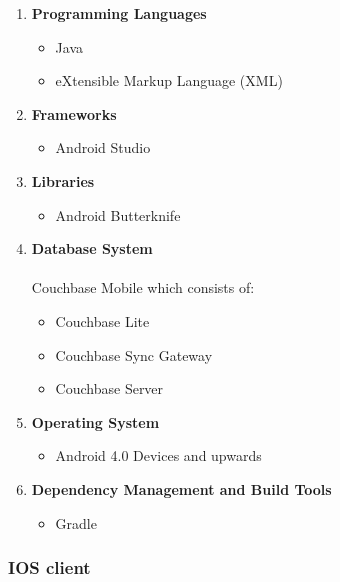 \documentclass{article}
\begin{document}
			\begin{enumerate}
				 \item \textbf{Programming Languages}
				\begin{itemize}
					\item Java
					\item eXtensible Markup Language (XML)
				\end{itemize}
			\item \textbf{Frameworks}
				\begin{itemize}
					\item Android Studio
				\end{itemize}
			\item \textbf{Libraries}
				\begin{itemize}
					\item Android Butterknife
				\end{itemize}
			\item \textbf{Database System} \\ \\ 
			Couchbase Mobile which consists of:
				\begin{itemize}
	 				\item Couchbase Lite
					\item Couchbase Sync Gateway
					\item Couchbase Server
				\end{itemize}
				\item \textbf{Operating System}
			\begin{itemize}
	 				\item Android 4.0 Devices and upwards
				\end{itemize}
			\item \textbf{Dependency Management and Build Tools}
				\begin{itemize}
					\item Gradle
				\end{itemize}
			\end{enumerate}
	
		\subsubsection{IOS client}
		
\end{document}
